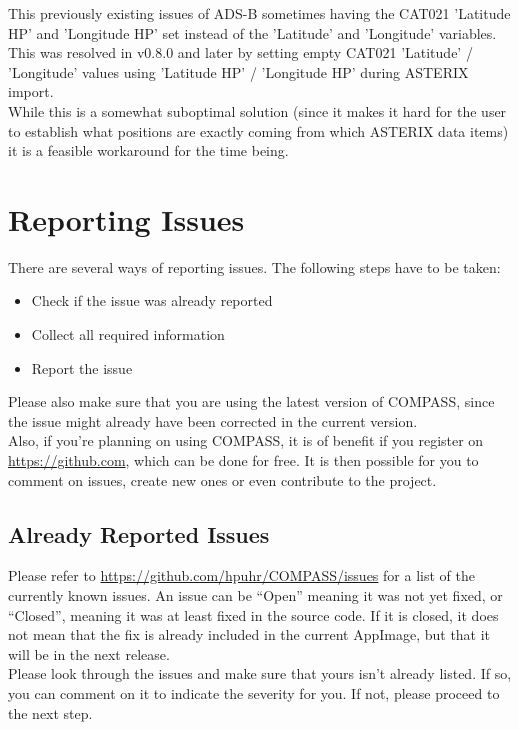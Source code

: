 This previously existing issues of ADS-B sometimes having the CAT021 'Latitude HP' and 'Longitude HP' set instead of the 'Latitude' and 'Longitude' variables. This was resolved in v0.8.0 and later by setting empty CAT021 'Latitude' / 'Longitude' values using 'Latitude HP' / 'Longitude HP' during ASTERIX import. \\

While this is a somewhat suboptimal solution (since it makes it hard for the user to establish what positions are exactly coming from which ASTERIX data items) it is a feasible workaround for the time being.


\section{Reporting Issues}

There are several ways of reporting issues. The following steps have to be taken:

\begin{itemize}  
\item Check if the issue was already reported
\item Collect all required information
\item Report the issue
\end{itemize} 

Please also make sure that you are using the latest version of COMPASS, since the issue might already have been corrected in the current version. \\

Also, if you're planning on using COMPASS, it is of benefit if you register on \url{https://github.com}, which can be done for free. It is then possible for you to comment on issues, create new ones or even contribute to the project.

\subsection{Already Reported Issues}

Please refer to \url{https://github.com/hpuhr/COMPASS/issues} for a list of the currently known issues. An issue can be ``Open'' meaning it was not yet fixed, or ``Closed'', meaning it was at least fixed in the source code. If it is closed, it does not mean that the fix is already included in the current AppImage, but that it will be in the next release. \\

Please look through the issues and make sure that yours isn't already listed. If so, you can comment on it to indicate the severity for you. If not, please proceed to the next step.

